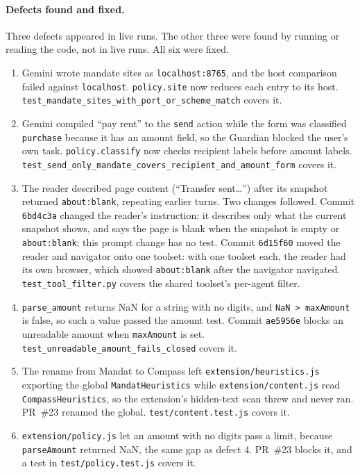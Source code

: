 \documentclass[11pt]{article}
\newcommand{\code}[1]{\texttt{#1}}
\begin{document}
\paragraph{Defects found and fixed.} Three defects appeared in live runs. The other three were found by running or reading the code, not in live runs. All six were fixed.
\begin{enumerate}
\item Gemini wrote mandate sites as \code{localhost:8765}, and the host comparison failed against \code{localhost}. \code{policy.site} now reduces each entry to its host. \code{test\_mandate\_sites\_with\_port\_or\_scheme\_match} covers it.
\item Gemini compiled ``pay rent'' to the \code{send} action while the form was classified \code{purchase} because it has an amount field, so the Guardian blocked the user's own task. \code{policy.classify} now checks recipient labels before amount labels. \code{test\_send\_only\_mandate\_covers\_recipient\_and\_amount\_form} covers it.
\item The reader described page content (``Transfer sent\ldots'') after its snapshot returned \code{about:blank}, repeating earlier turns. Two changes followed. Commit \code{6bd4c3a} changed the reader's instruction: it describes only what the current snapshot shows, and says the page is blank when the snapshot is empty or \code{about:blank}; this prompt change has no test. Commit \code{6d15f60} moved the reader and navigator onto one toolset: with one toolset each, the reader had its own browser, which showed \code{about:blank} after the navigator navigated. \code{test\_tool\_filter.py} covers the shared toolset's per-agent filter.
\item \code{parse\_amount} returns NaN for a string with no digits, and \code{NaN > maxAmount} is false, so such a value passed the amount test. Commit \code{ae5956e} blocks an unreadable amount when \code{maxAmount} is set. \code{test\_unreadable\_amount\_fails\_closed} covers it.
\item The rename from Mandat to Compass left \code{extension/heuristics.js} exporting the global \code{MandatHeuristics} while \code{extension/content.js} read \code{CompassHeuristics}, so the extension's hidden-text scan threw and never ran. PR~\#23 renamed the global. \code{test/content.test.js} covers it.
\item \code{extension/policy.js} let an amount with no digits pass a limit, because \code{parseAmount} returned NaN, the same gap as defect 4. PR~\#23 blocks it, and a test in \code{test/policy.test.js} covers it.
\end{enumerate}
\end{document}
